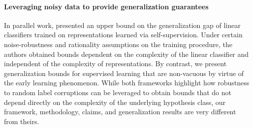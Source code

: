 \paragraph{Leveraging noisy data to provide generalization guarantees}
In parallel work, \citet{bansal2020self} 
presented an upper bound 
on the generalization gap 
of linear classifiers 
trained on representations 
learned via self-supervision. 
Under certain noise-robustness 
and rationality assumptions 
on the training procedure, 
the authors obtained bounds 
dependent on the complexity 
of the linear classifier 
and independent of the complexity of representations. 
By contrast, 
we present generalization bounds 
for 
supervised learning 
that are non-vacuous by virtue 
of the early learning phenomenon. 
While both frameworks highlight
how robustness to random label corruptions 
can be leveraged to obtain bounds 
that do not depend directly
on the complexity of the underlying hypothesis class,
% 
our framework, methodology, claims, 
and generalization results
are very different from theirs.




% 
% 








